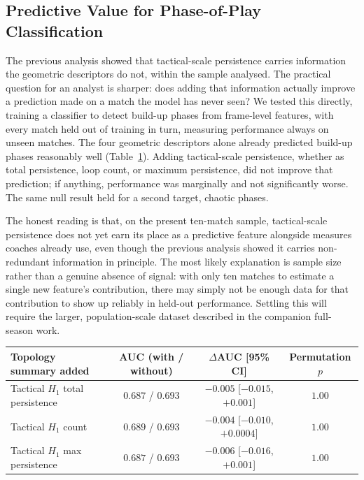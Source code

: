 \subsection{Predictive Value for Phase-of-Play Classification}

The previous analysis showed that tactical-scale persistence carries
information the geometric descriptors do not, within the sample
analysed. The practical question for an analyst is sharper: does adding
that information actually improve a prediction made on a match the
model has never seen? We tested this directly, training a classifier to
detect build-up phases from frame-level features, with every match held
out of training in turn, measuring performance always on
unseen matches. The four geometric descriptors alone already predicted
build-up phases reasonably well (Table~\ref{tab:predictive}). Adding tactical-scale persistence, whether as total persistence, loop count, or maximum persistence, did not improve that prediction; if anything,
performance was marginally and not significantly worse. The same null
result held for a second target, chaotic phases.

The honest reading is that, on the present ten-match sample,
tactical-scale persistence does not yet earn its place as a predictive
feature alongside measures coaches already use, even though the
previous analysis showed it carries non-redundant information in
principle. The most likely explanation is sample size rather than a
genuine absence of signal: with only ten matches to estimate a single
new feature's contribution, there may simply not be enough data for
that contribution to show up reliably in held-out performance. Settling
this will require the larger, population-scale dataset described in
the companion full-season work.

\begin{table}
{\begin{tabular}{lccc} \toprule
Topology summary added & AUC (with / without) & $\Delta$AUC [95\% CI] & Permutation $p$ \\ \midrule
Tactical $H_1$ total persistence & $0.687$ / $0.693$ & $-0.005$ [$-0.015$, $+0.001$] & $1.00$ \\
Tactical $H_1$ count & $0.689$ / $0.693$ & $-0.004$ [$-0.010$, $+0.0004$] & $1.00$ \\
Tactical $H_1$ max persistence & $0.687$ / $0.693$ & $-0.006$ [$-0.016$, $+0.001$] & $1.00$ \\
\bottomrule
\end{tabular}}
\label{tab:predictive}
\end{table}

